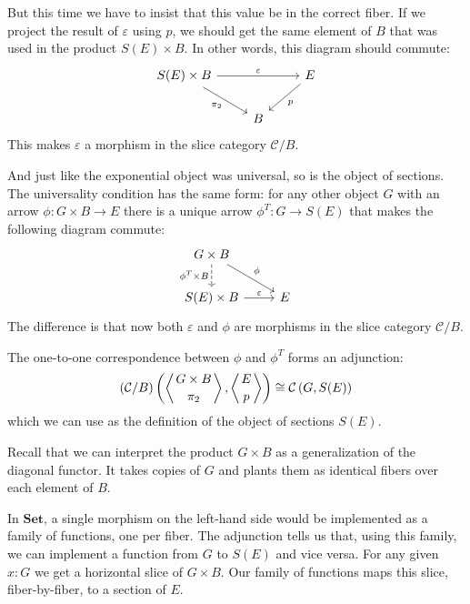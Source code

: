 \documentclass[DaoFP]{subfiles}
\begin{document}
But this time we have to insist that this value be in the correct fiber. If we project the result of $\varepsilon$ using $p$, we should get the same element of $B$ that was used in the product $S(E) \times B$. In other words, this diagram should commute:
\[
 \begin{tikzcd}
 S(E) \times B 
 \arrow[rr, "\varepsilon"]
 \arrow[dr, "\pi_2"']
 && E
 \arrow[dl, "p"]
 \\
 &B
  \end{tikzcd}
\]
This makes $\varepsilon$ a morphism in the slice category $\mathcal{C}/B$.

And just like the exponential object was universal, so is the object of sections. The universality condition has the same form: for any other object $G$ with an arrow $\phi \colon G \times B \to E$ there is a unique arrow $\phi^T \colon G \to S(E)$ that makes the following diagram commute:
\[
 \begin{tikzcd}
 G \times B
 \arrow[d, dashed, "\phi^T \times B"']
 \arrow[dr, "\phi"]
 \\
 S(E) \times B
 \arrow[r, "\varepsilon"]
 &E
  \end{tikzcd}
\]
The difference is that now both $\varepsilon$ and $\phi$ are morphisms in the slice category $\mathcal{C}/B$. 

The one-to-one correspondence between $\phi$ and $\phi^T$ forms an adjunction:
\[(\mathcal{C}/B) \left( \left \langle {G\times B \atop \pi_2} \right \rangle , \left \langle {E \atop p } \right \rangle \right) \cong \mathcal{C} \left(G, S(E)\right) \]
which we can use as the definition of the object of sections $S(E)$. 

Recall that we can interpret the product $G \times B$ as a generalization of the diagonal functor. It takes copies of $G$ and plants them as identical fibers over each element of $B$. 

In $\mathbf{Set}$, a single morphism on the left-hand side would be implemented as a family of functions, one per fiber. The adjunction tells us that, using this family, we can implement a function from $G$ to $S(E)$ and vice versa. For any given $x \colon G$ we get a horizontal slice of $G \times B$. Our family of functions maps this slice, fiber-by-fiber, to a section of $E$.
\end{document}

